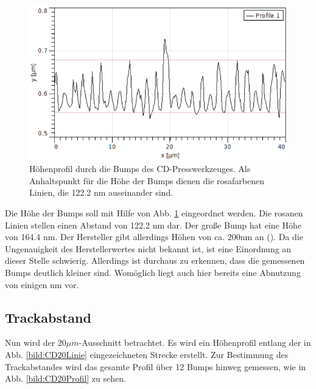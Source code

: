\begin{figure}[h]
    \centering
    \includegraphics[scale = 0.6]{Bilder/CD50Profil.png}
    \caption{Höhenprofil durch die Bumps des CD-Presswerkzeuges. Als Anhaltspunkt für die Höhe der Bumps dienen die rosafarbenen Linien, die 
    122.2 nm auseinander sind.}
    \label{bild:CD50Profil}
\end{figure}

Die Höhe der Bumps soll mit Hilfe von Abb. \ref{bild:CD50Profil} eingeordnet werden. 
Die rosanen Linien stellen einen Abstand von 122.2 nm dar. Der große Bump hat eine Höhe von 164.4 nm. Der Hersteller 
gibt allerdings Höhen von ca. 200nm an (\cite{SampleKit2007}). Da die Ungenauigkeit des Herstellerwertes nicht bekannt ist, ist eine Einordnung an dieser Stelle 
schwierig. Allerdings ist durchaus zu erkennen, dass die gemessenen Bumps deutlich kleiner sind. Womöglich liegt auch hier bereits eine 
Abnutzung von einigen nm vor.
\newpage

\subsection{Trackabstand}

Nun wird der 20$\mu m$-Ausschnitt betrachtet. Es wird ein Höhenprofil entlang der in Abb. \ref{bild:CD20Linie} eingezeichneten Strecke 
erstellt. Zur Bestimmung des Trackabstandes wird das gesamte Profil über 12 Bumps hinweg gemessen, wie in Abb. \ref{bild:CD20Profil} zu 
sehen. 

